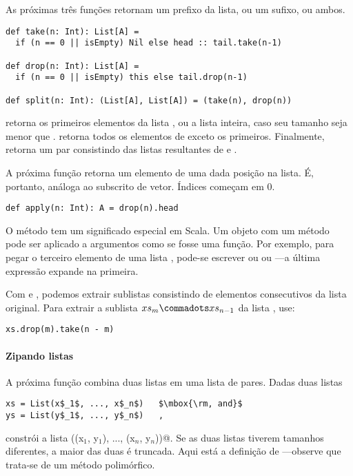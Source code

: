 As próximas três funções retornam um prefixo da lista, ou um sufixo, ou ambos.
\begin{lstlisting}
def take(n: Int): List[A] =
  if (n == 0 || isEmpty) Nil else head :: tail.take(n-1)

def drop(n: Int): List[A] =
  if (n == 0 || isEmpty) this else tail.drop(n-1)

def split(n: Int): (List[A], List[A]) = (take(n), drop(n))
\end{lstlisting}
 retorna os primeiros  elementos da lista 
, ou a lista inteira, caso seu tamanho seja menor que .
 retorna todos os elementos de  exceto os 
 primeiros. Finalmente,  retorna um par
consistindo das listas resultantes de  e .

A próxima função retorna um elemento de uma dada posição na lista.
É, portanto, análoga ao subscrito de vetor. Índices começam em 0. 
\begin{lstlisting}
def apply(n: Int): A = drop(n).head
\end{lstlisting}
O método  tem um significado especial em Scala. Um objeto com 
um método  pode ser aplicado a argumentos como se fosse uma função.
Por exemplo, para pegar o terceiro elemento de uma lista , pode-se 
escrever ou  ou ---a última expressão expande na primeira.

Com  e , podemos extrair sublistas consistindo de elementos 
consecutivos da lista original. Para extrair a sublista $xs_m \commadots xs_{n-1}$ da
lista , use:

\begin{lstlisting}
xs.drop(m).take(n - m)
\end{lstlisting}

\paragraph{Zipando listas} A próxima função combina duas listas em uma lista de pares.
Dadas duas listas
\begin{lstlisting}
xs = List(x$_1$, ..., x$_n$)   $\mbox{\rm, and}$
ys = List(y$_1$, ..., y$_n$)   ,
\end{lstlisting}

 constrói a lista \lstinline@List((x$_1$, y$_1$), ..., (x$_n$, y$_n$))@.
Se as duas listas tiverem tamanhos diferentes, a maior das duas é truncada. Aqui está 
a definição de ---observe que trata-se de um método polimórfico. 

